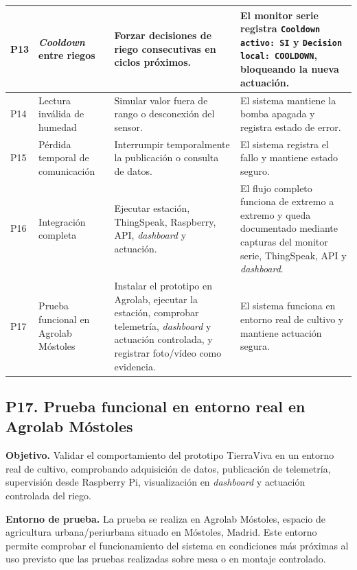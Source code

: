 \begin{longtable}{|
>{\centering\arraybackslash}p{}|
>{\raggedright\arraybackslash}p{}|
>{\raggedright\arraybackslash}p{}|
>{\raggedright\arraybackslash}p{}|}
\hline
P13 & \textit{Cooldown} entre riegos & Forzar decisiones de riego consecutivas en ciclos próximos. & El monitor serie registra \texttt{Cooldown activo: SI} y \texttt{Decision local: COOLDOWN}, bloqueando la nueva actuación. \\
\hline
P14 & Lectura inválida de humedad & Simular valor fuera de rango o desconexión del sensor. & El sistema mantiene la bomba apagada y registra estado de error. \\
\hline
P15 & Pérdida temporal de comunicación & Interrumpir temporalmente la publicación o consulta de datos. & El sistema registra el fallo y mantiene estado seguro. \\
\hline
P16 & Integración completa & Ejecutar estación, ThingSpeak, Raspberry, API, \textit{dashboard} y actuación. & El flujo completo funciona de extremo a extremo y queda documentado mediante capturas del monitor serie, ThingSpeak, API y \textit{dashboard}. \\
\hline
P17 & Prueba funcional en Agrolab Móstoles & Instalar el prototipo en Agrolab, ejecutar la estación, comprobar telemetría, \textit{dashboard} y actuación controlada, y registrar foto/vídeo como evidencia. & El sistema funciona en entorno real de cultivo y mantiene actuación segura. \\
\hline

\end{longtable}

\normalsize
\endgroup

\subsection{P17. Prueba funcional en entorno real en Agrolab Móstoles}
\label{subsec:p17_agrolab_mostoles}

\textbf{Objetivo.} Validar el comportamiento del prototipo TierraViva en un entorno real de cultivo, comprobando adquisición de datos, publicación de telemetría, supervisión desde Raspberry Pi, visualización en \textit{dashboard} y actuación controlada del riego.

\textbf{Entorno de prueba.} La prueba se realiza en Agrolab Móstoles, espacio de agricultura urbana/periurbana situado en Móstoles, Madrid. Este entorno permite comprobar el funcionamiento del sistema en condiciones más próximas al uso previsto que las pruebas realizadas sobre mesa o en montaje controlado.

